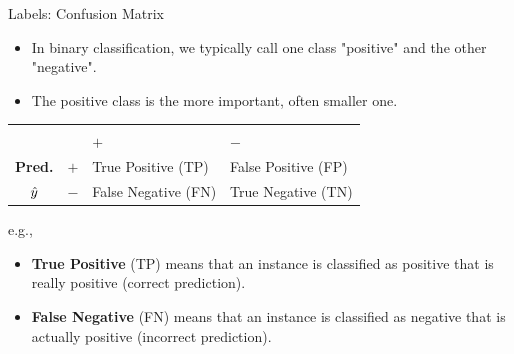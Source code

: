 \begin{vbframe}{Labels: Confusion Matrix}

\begin{itemize}
  \item In binary classification, we typically call one class "positive" and the 
  other "negative".
  \item The positive class is the more important, often smaller one.
\end{itemize}


\begin{center}
\small
\begin{tabular}{cc|>{\centering\arraybackslash}p{7em}>{\centering\arraybackslash}p{8em}}
    & & \multicolumn{2}{c}{\bfseries True Class $y$} \\
    & & $+$ & $-$ \\
    \hline
    \bfseries Pred.     & $+$ & True Positive (TP)  & False Positive (FP) \\
              $\hat{y}$ & $-$ & False Negative (FN) & True Negative (TN) \\
\end{tabular}
\end{center}
e.g.,
\begin{itemize}
  \item \textbf{True Positive} (TP) means that an instance is classified as 
  positive that is really positive (correct prediction).
  \item \textbf{False Negative} (FN) means that an instance is classified as 
  negative that is actually positive (incorrect prediction). 
\end{itemize}

\end{vbframe}


